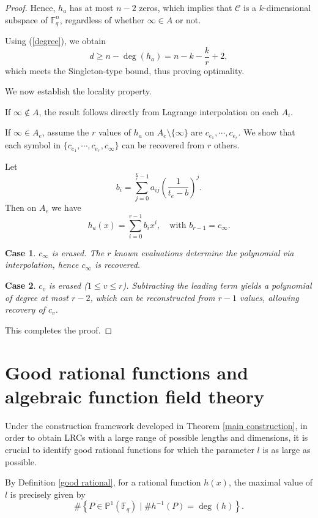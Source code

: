 \documentclass[1p,final]{elsarticle}
\newtheorem{open problem}[theorem]{Open Problem}
\newtheorem{case}{Case}
\begin{document}
\begin{proof}
Hence, $h_{a}$ has at most $n-2$ zeros, which implies that $\mathcal{C}$ is a $k$-dimensional subspace of $\mathbb{F}_{q}^{n}$, regardless of whether $\infty\in A$ or not.

Using (\ref{degree}), we obtain
\[
d\ge n-\deg(h_{a})= n-k-\frac{k}{r}+2,
\]
which meets the Singleton-type bound, thus proving optimality.

\medskip

We now establish the locality property.

If $\infty\notin A$, the result follows directly from Lagrange interpolation on each $A_{i}$.

If $\infty\in A_{e}$, assume the $r$ values of $h_{a}$ on $ A_{e}\setminus\{\infty\}$ are $c_{e_{1}},\cdots, c_{e_{r}}$. We show that each symbol in $\{c_{e_{1}},\cdots, c_{e_{r}},c_{\infty}\}$ can be recovered from $r$ others.

Let 
\[
b_{i}=\sum_{j=0}^{\frac{k}{r}-1} a_{ij} \left( \frac{1}{t_{e}-b} \right)^{j}.
\]
Then on $A_{e}$ we have
\[
h_{a}(x)=\sum_{i=0}^{r-1}b_{i}x^{i}, \quad \text{with } b_{r-1}=c_{\infty}.
\]

\begin{case}
$c_{\infty}$ is erased. The $r$ known evaluations determine the polynomial via interpolation, hence $c_{\infty}$ is recovered.
\end{case}

\begin{case}
$c_{v}$ is erased ($1\le v\le r$). Subtracting the leading term yields a polynomial of degree at most $r-2$, which can be reconstructed from $r-1$ values, allowing recovery of $c_v$.
\end{case}

This completes the proof.
\end{proof}

	
	
	\section{Good rational functions and algebraic function field theory}\label{how good}

Under the construction framework developed in Theorem \ref{main construction}, in order to obtain LRCs with a large range of possible lengths and dimensions, it is crucial to identify good rational functions for which the parameter $l$ is as large as possible.

\medskip

By Definition \ref{good rational}, for a rational function $h(x)$, the maximal value of $l$ is precisely given by
\begin{equation}\label{inv}
\#\left\{P \in \mathbb{P}^1(\mathbb{F}_q)\mid 	\# h^{-1}(P)=\deg (h)\right\}.
\end{equation}
\end{document}
